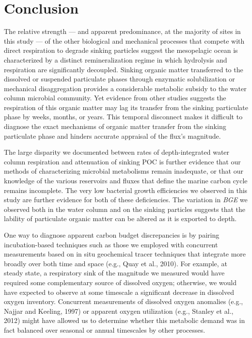 \section{Conclusion}

The relative strength --- and apparent predominance, at the majority of sites in this study --- of the other biological and mechanical processes that compete with direct respiration to degrade sinking particles suggest the mesopelagic ocean is characterized by a distinct remineralization regime in which hydrolysis and respiration are significantly decoupled. Sinking organic matter transferred to the dissolved or suspended particulate phases through enzymatic solubilization or mechanical disaggregation provides a considerable metabolic subsidy to the water column microbial community. Yet evidence from other studies suggests the respiration of this organic matter may lag its transfer from the sinking particulate phase by weeks, months, or years. This temporal disconnect makes it difficult to diagnose the exact mechanisms of organic matter transfer from the sinking particulate phase and hinders accurate appraisal of the flux's magnitude.

The large disparity we documented between rates of depth-integrated water column respiration and attenuation of sinking POC is further evidence that our methods of characterizing microbial metabolisms remain inadequate, or that our knowledge of the various reservoirs and fluxes that define the marine carbon cycle remains incomplete. The very low bacterial growth efficiencies we observed in this study are further evidence for both of these deficiencies. The variation in \emph{BGE} we observed both in the water column and on the sinking particles suggests that the lability of particulate organic matter can be altered as it is exported to depth.

One way to diagnose apparent carbon budget discrepancies is by pairing incubation-based techniques such as those we employed with concurrent measurements based on in situ geochemical tracer techniques that integrate more broadly over both time and space (e.g., Quay et al., 2010). For example, at steady state, a respiratory sink of the magnitude we measured would have required some complementary source of dissolved oxygen; otherwise, we would have expected to observe at some timescale a significant decrease in dissolved oxygen inventory. Concurrent measurements of dissolved oxygen anomalies (e.g., Najjar and Keeling, 1997) or apparent oxygen utilization (e.g., Stanley et al., 2012) might have allowed us to determine whether this metabolic demand was in fact balanced over seasonal or annual timescales by other processes.

